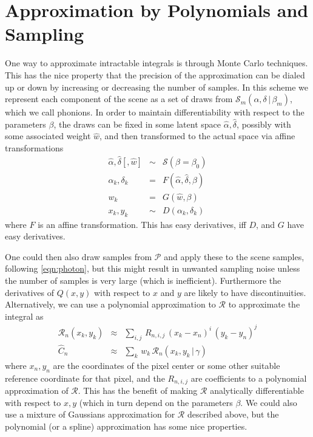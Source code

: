 \documentclass[modern]{aastex62}
\newcommand{\given}{\,|\,}
\newcommand{\countrate}{\hat{C}}
\newcommand{\psf}{\mathcal{P}}
\newcommand{\prf}{\mathcal{R}}
\newcommand{\qe}{Q}
\newcommand{\scene}{\mathcal{S}}
\begin{document}
\section{Approximation by Polynomials and Sampling}
One way to approximate intractable integrals is through Monte Carlo techniques.
This has the nice property that the precision of the approximation can be dialed up or down by increasing or decreasing the number of samples.
In this scheme we represent each component of the scene as a set of draws from $\scene_m(\alpha, \delta \given \beta_m)$, which we call phonions.
In order to maintain differentiability with respect to the parameters $\beta$, the draws can be fixed in some latent space $\hat{\alpha}, \hat{\delta}$,
possibly with some associated weight $\hat{w}$,
and then transformed to the actual space via affine transformations
\begin{eqnarray}
\hat{\alpha}, \hat{\delta} [, \hat{w}] & \sim & \scene(\beta=\beta_0) \\
\alpha_k, \delta_k & = & F(\hat{\alpha}, \hat{\delta}, \beta) \nonumber \\
w_k & = & G(\hat{w}, \beta) \nonumber \\
x_k, y_k & \sim & D(\alpha_k, \delta_k) \nonumber
\end{eqnarray}
where $F$ is an affine transformation. This has easy derivatives, iff $D$, and $G$ have easy derivatives.

One could then also draw samples from $\psf$ and apply these to the scene samples, following \ref{eqn:photon},
 but this might result in unwanted sampling noise unless the number of samples is very large (which is inefficient).
Furthermore the derivatives of $\qe(x, y)$ with respect to $x$ and $y$ are likely to have discontinuities.
Alternatively, we can use a polynomial approximation to $\prf$ to approximate the integral as
\begin{eqnarray}
\prf_n(x_k, y_k) & \approx & \sum_{i,j} \, R_{n, i, j} \, (x_k - x_n)^i \, (y_k - y_n)^j \\
\countrate_n & \approx & \sum_k \, w_k \, \prf_n(x_k, y_k \given \gamma) \nonumber
\end{eqnarray}
where $x_n, y_n$ are the coordinates of the pixel center or some other suitable reference coordinate for that pixel, 
and the $R_{n,i,j}$ are coefficients to a polynomial approximation of $\prf$.
This has the benefit of making $\prf$ analytically differentiable with respect to $x, y$ (which in turn depend on the parameters $\beta$.
We could also use a mixture of Gaussians approximation for $\prf$ described above, but the polynomial  (or a spline) approximation has some nice properties.
\end{document}
